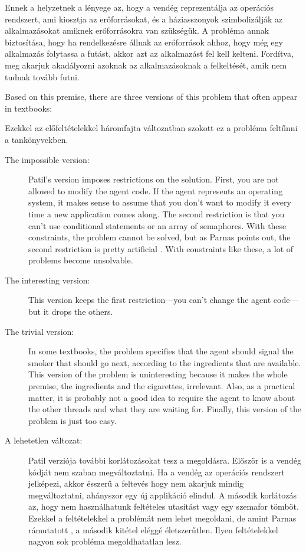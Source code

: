 \documentclass{book}
\begin{document}
Ennek a helyzetnek a lényege az, hogy a vendég reprezentálja az operációs rendszert,
ami kiosztja az erőforrásokat, és a háziasszonyok szimbolizálják az alkalmazásokat
amiknek erőforrásokra van szükségük. A probléma annak biztosítása,
hogy ha rendelkezésre állnak az erőforrások ahhoz, hogy még egy alkalmazás
folytassa a futást, akkor azt az alkalmazást fel kell kelteni.
Fordítva, meg akarjuk akadályozni azoknak
az alkalmazásoknak a felkeltését, amik nem tudnak tovább futni.


Based on this premise, there are three versions of this problem
that often appear in textbooks:

Ezekkel az előfeltételekkel háromfajta változatban szokott ez a probléma
feltűnni a tankönyvekben.


\begin{description}

\item[The impossible version:] Patil's version imposes restrictions on
the solution.  First, you are not allowed to modify the agent code.
If the agent represents an operating system, it makes sense to assume
that you don't want to modify it every time a new application comes
along.  The second restriction is that you can't use conditional
statements or an array of semaphores.  With these constraints, the
problem cannot be solved, but as Parnas points out, the second
restriction is pretty artificial \cite{Parnas}.  With constraints like
these, a lot of problems become unsolvable.

\item[The interesting version:] This version keeps the first
restriction---you can't change the agent code---but it drops the others.

\item[The trivial version:] In some textbooks, the problem specifies
that the agent should signal the smoker that should go next, according
to the ingredients that are available.  This version of the problem
is uninteresting because it makes the whole premise, the ingredients
and the cigarettes, irrelevant.  Also, as a practical matter, it is
probably not a good idea to require the agent to know about the other
threads and what they are waiting for.  Finally, this version of
the problem is just too easy.


\item[A lehetetlen változat:] Patil verziója további korlátozásokat
tesz a megoldásra. Először is a vendég kódját nem szaban megváltoztatni.
Ha a vendég az operációs rendszert jelképezi, akkor ésszerű a feltevés hogy
nem akarjuk mindig megváltoztatni, ahányszor egy új applikáció elindul.
A második korlátozás az, hogy nem használhatunk feltételes utasítást vagy
egy szemafor tömböt. Ezekkel a feltételekkel a problémát nem lehet megoldani,
de amint Parnas rámutatott \cite{Parnas}, a második kitétel eléggé életszerűtlen.
Ilyen feltételekkel nagyon sok probléma megoldhatatlan lesz.


\end{description}
\end{document}
